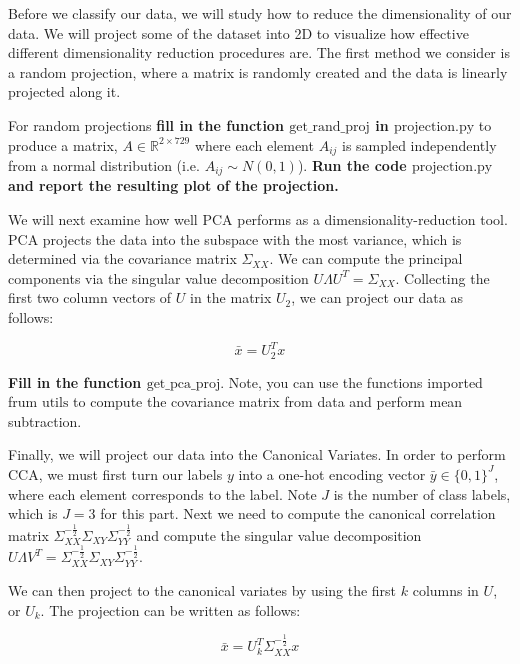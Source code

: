 \begin{Parts}
\Part Before we classify our data, we will study how to reduce the
dimensionality of our data. We will project some of the dataset into 2D to visualize how effective different dimensionality reduction procedures are. The first method we consider is a random projection, where a matrix is randomly created and the data is linearly projected along it. 

For random projections {\bf fill in the function $\mbox{get\_rand\_proj}$ in $\mbox{projection.py}$} to produce a matrix, $A \in \mathbb{R}^{2 \times 729}$ where each element $A_{ij}$ is sampled independently from a normal distribution (i.e. $A_{ij} \sim N(0,1)$). {\bf Run the code $\mbox{projection.py}$ and report the resulting plot of the projection.}







\Part We will next examine how well PCA performs as a
dimensionality-reduction tool. PCA projects the data into the subspace with the most variance, which is determined via the covariance matrix $\Sigma_{XX}$. We can compute the principal components via the singular value decomposition $U\Lambda U^T = \Sigma_{XX}$. Collecting the first two column vectors of $U$ in the matrix $U_2$, we can project our data as follows: 

$$\bar{x} = U_2^T x$$


 {\bf Fill in the function  $\mbox{get\_pca\_proj}$}. Note, you can use the functions imported frum $\mbox{utils}$ to compute the covariance matrix from data and perform mean subtraction.



\Part Finally, we will project our data into the Canonical Variates. In order to perform CCA, we must first turn our labels $y$ into a one-hot encoding vector $\bar{y} \in \lbrace 0,1 \rbrace^{J}$, where each element corresponds to the label. Note $J$ is the number of class labels, which is $J = 3$ for this part.   Next we need to compute the canonical correlation matrix $\Sigma_{XX}^{-\frac{1}{2}}\Sigma_{XY}\Sigma_{YY}^{-\frac{1}{2}}$ and compute the singular value decomposition $U\Lambda V^T = \Sigma_{XX}^{-\frac{1}{2}}\Sigma_{XY}\Sigma_{YY}^{-\frac{1}{2}}$. 

We can then project to the canonical variates by using the first $k$ columns in $U$, or $U_k$. The projection can be written as follows: 

$$\bar{x} = U_k^T \Sigma_{XX}^{-\frac{1}{2}} x$$


\end{Parts}
